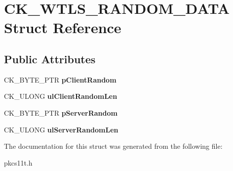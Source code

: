 \hypertarget{struct_c_k___w_t_l_s___r_a_n_d_o_m___d_a_t_a}{}\section{C\+K\+\_\+\+W\+T\+L\+S\+\_\+\+R\+A\+N\+D\+O\+M\+\_\+\+D\+A\+TA Struct Reference}
\label{struct_c_k___w_t_l_s___r_a_n_d_o_m___d_a_t_a}
\subsection*{Public Attributes}
\begin{DoxyCompactItemize}
\item 
\mbox{\label{struct_c_k___w_t_l_s___r_a_n_d_o_m___d_a_t_a_a3796698993739c56f2578a0554fba33a}} 
C\+K\+\_\+\+B\+Y\+T\+E\+\_\+\+P\+TR {\bfseries p\+Client\+Random}
\item 
\mbox{\label{struct_c_k___w_t_l_s___r_a_n_d_o_m___d_a_t_a_a821ad4fcd011c6211ebaa6f4ede6e6b8}} 
C\+K\+\_\+\+U\+L\+O\+NG {\bfseries ul\+Client\+Random\+Len}
\item 
\mbox{\label{struct_c_k___w_t_l_s___r_a_n_d_o_m___d_a_t_a_a45281876a3693977cc419fc41e026c72}} 
C\+K\+\_\+\+B\+Y\+T\+E\+\_\+\+P\+TR {\bfseries p\+Server\+Random}
\item 
\mbox{\label{struct_c_k___w_t_l_s___r_a_n_d_o_m___d_a_t_a_a7701c5a19b31181433fe42690e5a3e4b}} 
C\+K\+\_\+\+U\+L\+O\+NG {\bfseries ul\+Server\+Random\+Len}
\end{DoxyCompactItemize}


The documentation for this struct was generated from the following file\+:\begin{DoxyCompactItemize}
\item 
pkcs11t.\+h\end{DoxyCompactItemize}
